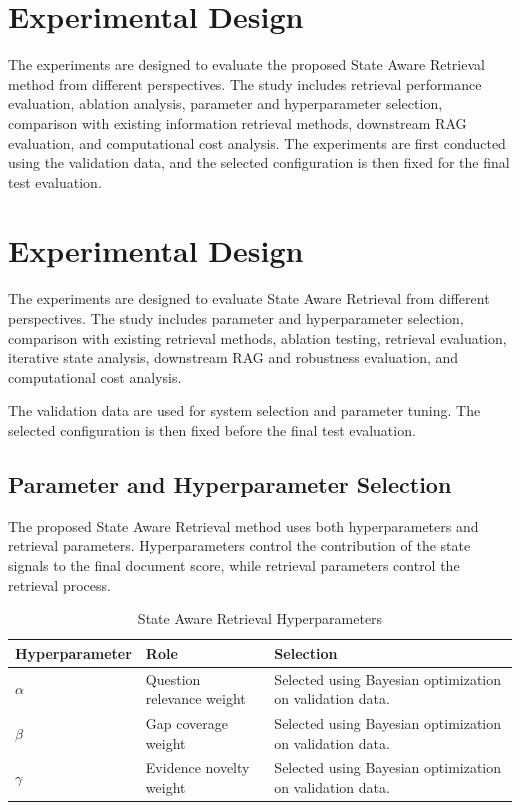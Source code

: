 \documentclass[12pt,a4paper]{report}
\begin{document}
\section{Experimental Design}

The experiments are designed to evaluate the proposed State Aware
Retrieval method from different perspectives. The study includes
retrieval performance evaluation, ablation analysis, parameter and
hyperparameter selection, comparison with existing information
retrieval methods, downstream RAG evaluation, and computational cost
analysis. The experiments are first conducted using the validation
data, and the selected configuration is then fixed for the final test
evaluation.
\section{Experimental Design}

The experiments are designed to evaluate State Aware Retrieval from
different perspectives. The study includes parameter and hyperparameter
selection, comparison with existing retrieval methods, ablation testing,
retrieval evaluation, iterative state analysis, downstream RAG and
robustness evaluation, and computational cost analysis.

The validation data are used for system selection and parameter tuning.
The selected configuration is then fixed before the final test
evaluation.

\subsection{Parameter and Hyperparameter Selection}

The proposed State Aware Retrieval method uses both hyperparameters and
retrieval parameters. Hyperparameters control the contribution of the
state signals to the final document score, while retrieval parameters
control the retrieval process.

\begin{table}[H]
\centering
\caption{State Aware Retrieval Hyperparameters}
\label{tab:sar-hyperparameters}
\renewcommand{\arraystretch}{1.2}
\begin{tabular}{|p{1.45in}|p{1.75in}|p{2.9in}|}
\hline
\textbf{Hyperparameter} & \textbf{Role} & \textbf{Selection} \\ \hline
$\alpha$ & Question relevance weight &
Selected using Bayesian optimization on validation data. \\ \hline
$\beta$ & Gap coverage weight &
Selected using Bayesian optimization on validation data. \\ \hline
$\gamma$ & Evidence novelty weight &
Selected using Bayesian optimization on validation data. \\ \hline
\end{tabular}
\end{table}
\end{document}
